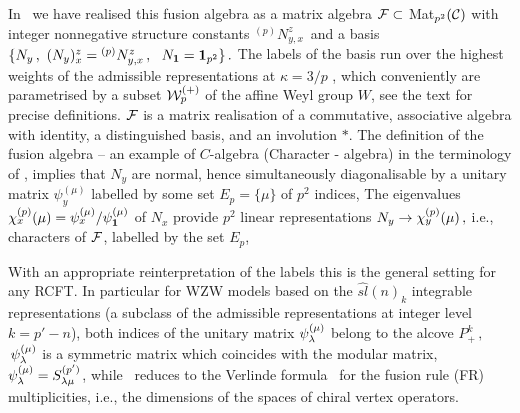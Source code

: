 In \FGP\ we have realised this fusion algebra as a matrix algebra
${\cal F}\subset$ Mat$_{p^2}({\cal C})$ with integer nonnegative
structure constants ${}^{(p)}N_{y, x}^z\,$ and a basis $\{N_y\,,
\ (N_y)_x^z={}^{(p)}N_{y, x}^z\,, \ \ N_{{\bf 1}}={\bf 1}_{p^2}\}\,.$  The
labels of the basis run over the highest weights of the
admissible representations at $\kappa=3/p$ \KW, which
conveniently are parametrised  by a subset ${\cal W}^{(+)}_p$ of the affine
Weyl group $W$,
see the text for precise definitions.  ${\cal F}$ is a
matrix realisation of a commutative, associative algebra with
identity, a distinguished basis, and an involution $*$.  The
definition of the fusion algebra -- an example of $C$-algebra
(Character - algebra)  in the terminology of \BI{}, implies that
$N_y$ are normal, hence simultaneously diagonalisable by a
unitary matrix $\psi_y^{(\mu)}$ labelled by some set
$E_p=\{\mu\}$ of $p^2$ indices, 
%
\eqn{}
%
The eigenvalues
$\chi_{x}^{(p)}(\mu)=\psi_x^{(\mu)}/\psi_{{\bf 1}}^{(\mu)}$ of  $N_x$
provide $p^2$  linear representations $N_y\rightarrow
\chi_y^{(p)}(\mu)\,, $ i.e., characters of ${\cal F}$, labelled by the
set $E_p$,
%
\eqn\Iqch{
  \cc_{x}^{(p)}(\mu)\ \cc_{y}^{(p)}(\mu)
= \sum_{z\in \CC_p} {}^{(p)}N^{z}_{x,y} \ \cc_{z}^{(p)}(\mu)\,. 
}
%

With an appropriate 
reinterpretation of 
the labels this is the general setting for any RCFT.
In particular for WZW models based on the $\widehat{sl}(n)_k$ 
integrable representations (a subclass of the 
admissible representations at integer level $k=p'-n$),
both indices of  the unitary matrix $\psi_{\lambda}^{(\mu)}$ belong
to the alcove 
$P_+^{k}\,,$ $\, \psi_{\lambda}^{(\mu)}$ 
is a symmetric matrix which coincides with the modular matrix, 
$\psi_{\lambda}^{(\mu)}=
S_{\lambda \mu}^{(p')}$, while  \pasv\ reduces to the Verlinde
formula \V\ for the fusion rule (FR) multiplicities, 
i.e., the dimensions of the spaces of chiral vertex operators.




